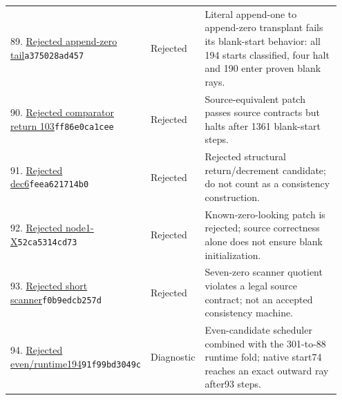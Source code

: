 \begin{longtable}{@{}p{0.27\linewidth}p{0.13\linewidth}p{0.55\linewidth}@{}}
89. \href{https://github.com/VladimirReshetnikov/ProveIt/blob/32d0d8b7d93a63ad4106c18cdb29b37927acdad2/Computability/BusyBeaver/Research/PA/docs/pa194dhs_conpa_2026-11-13/search/append_zero/rejected_append0.native.tm}{Rejected append-zero tail}\newline\texttt{a375028ad457} & Rejected & Literal append-one to append-zero transplant fails its blank-start behavior: all 194 starts classified, four halt and 190 enter proven blank rays.\\[5pt]
90. \href{https://github.com/VladimirReshetnikov/ProveIt/blob/32d0d8b7d93a63ad4106c18cdb29b37927acdad2/Computability/BusyBeaver/Research/PA/docs/PA194R_research_2026-11-14/research/zerojump_103.native.tm}{Rejected comparator return 103}\newline\texttt{ff86e0ca1cee} & Rejected & Source-equivalent patch passes source contracts but halts after 1361 blank-start steps.\\[5pt]
91. \href{https://github.com/VladimirReshetnikov/ProveIt/blob/32d0d8b7d93a63ad4106c18cdb29b37927acdad2/Computability/BusyBeaver/Research/PA/docs/pa194zr_conpa_2026-11-13/search/structural/rejected_dec6.native.tm}{Rejected dec6}\newline\texttt{feea621714b0} & Rejected & Rejected structural return/decrement candidate; do not count as a consistency construction.\\[5pt]
92. \href{https://github.com/VladimirReshetnikov/ProveIt/blob/32d0d8b7d93a63ad4106c18cdb29b37927acdad2/Computability/BusyBeaver/Research/PA/docs/pa194_radix_family_2026-11-13/search/machine_searches/inputs/REJECTED_node1_X.native.tm}{Rejected node1-X}\newline\texttt{52ca5314cd73} & Rejected & Known-zero-looking patch is rejected; source correctness alone does not ensure blank initialization.\\[5pt]
93. \href{https://github.com/VladimirReshetnikov/ProveIt/blob/32d0d8b7d93a63ad4106c18cdb29b37927acdad2/Computability/BusyBeaver/Research/PA/docs/pa195_followup_research/evidence/rejected_candidate_194/near194_bad4_k17595.native.tm}{Rejected short scanner}\newline\texttt{f0b9edcb257d} & Rejected & Seven-zero scanner quotient violates a legal source contract; not an accepted consistency machine.\\[5pt]
94. \href{https://github.com/VladimirReshetnikov/ProveIt/blob/32d0d8b7d93a63ad4106c18cdb29b37927acdad2/Computability/BusyBeaver/Research/PA/docs/pa194ax11q6_2026-11-14/research/diagnostics/even_runtime194.native.tm}{Rejected even/runtime194}\newline\texttt{91f99bd3049c} & Diagnostic & Even-candidate scheduler combined with the 301-to-88 runtime fold; native start74 reaches an exact outward ray after93 steps.\\[5pt]
\bottomrule\end{longtable}\endgroup
